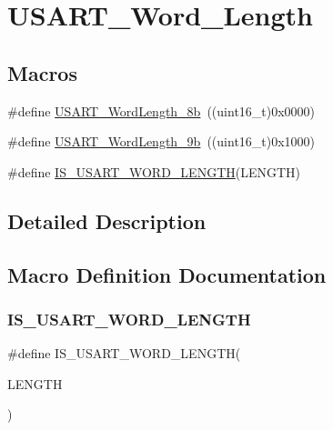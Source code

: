 \hypertarget{group___u_s_a_r_t___word___length}{}\section{U\+S\+A\+R\+T\+\_\+\+Word\+\_\+\+Length}
\label{group___u_s_a_r_t___word___length}
\subsection*{Macros}
\begin{DoxyCompactItemize}
\item 
\#define \mbox{\hyperlink{group___u_s_a_r_t___word___length_ga08682faddc657df85a93627b5a146c25}{U\+S\+A\+R\+T\+\_\+\+Word\+Length\+\_\+8b}}~((uint16\+\_\+t)0x0000)
\item 
\#define \mbox{\hyperlink{group___u_s_a_r_t___word___length_gae7dd162142660e09e2321aa3f33dc4d2}{U\+S\+A\+R\+T\+\_\+\+Word\+Length\+\_\+9b}}~((uint16\+\_\+t)0x1000)
\item 
\#define \mbox{\hyperlink{group___u_s_a_r_t___word___length_ga5b07b29ee91f0bea4c10ec0fd74fbc04}{I\+S\+\_\+\+U\+S\+A\+R\+T\+\_\+\+W\+O\+R\+D\+\_\+\+L\+E\+N\+G\+TH}}(L\+E\+N\+G\+TH)
\end{DoxyCompactItemize}


\subsection{Detailed Description}


\subsection{Macro Definition Documentation}
\mbox{\label{group___u_s_a_r_t___word___length_ga5b07b29ee91f0bea4c10ec0fd74fbc04}} 
\subsubsection{\texorpdfstring{IS\_USART\_WORD\_LENGTH}{IS\_USART\_WORD\_LENGTH}}
{\footnotesize\ttfamily \#define I\+S\+\_\+\+U\+S\+A\+R\+T\+\_\+\+W\+O\+R\+D\+\_\+\+L\+E\+N\+G\+TH(\begin{DoxyParamCaption}\item[{}]{L\+E\+N\+G\+TH }\end{DoxyParamCaption})}

